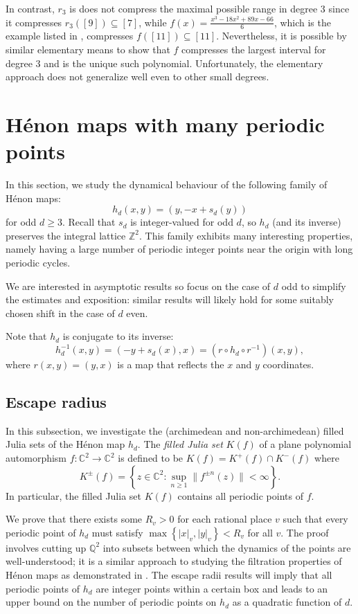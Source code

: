 \documentclass[12pt]{amsart}
\theoremstyle{definition}
\begin{document}
In contrast, $r_3$ is does not compress the maximal possible range in degree $3$ since it compresses $r_3([9])\subseteq [7]$, while $f(x) =\frac{x^3-18x^2+89x-66}{6}$, which is the example listed in \cite{doyle2022polynomialsrationalpreperiodicpoints}, compresses $f([11])\subseteq [11]$. Nevertheless, it is possible by similar elementary means to show that $f$ compresses the largest interval for degree 3 and is the unique such polynomial.  Unfortunately, the elementary approach does not generalize well even to other small degrees.




\section{Hénon maps with many periodic points} \label{section:henon}

In this section, we study the dynamical behaviour of the following family of H\'{e}non maps:
$$ h_d(x,y) = (y,-x+s_d(y)) $$
for odd $d\geq 3$. Recall that $s_d$ is integer-valued for odd $d$, so $h_d$ (and its inverse) preserves the integral lattice $\mathbb{Z}^2$. This family exhibits many interesting properties, namely having a large number of periodic integer points near the origin with long periodic cycles.  

We are interested in asymptotic results so focus on the case of $d$ odd to simplify the estimates and exposition: similar results will likely hold for some suitably chosen shift in the case of $d$ even.

Note that $h_d$ is conjugate to its inverse:
$$ h_d^{-1}(x,y) = (-y+s_d(x),x) = 
(r\circ h_d \circ r^{-1})(x,y), $$
where $r(x,y) = (y,x)$ is a map that reflects the $x$ and $y$ coordinates. 

\subsection{Escape radius}

In this subsection, we investigate the (archimedean and non-archimedean) filled Julia sets of the Hénon map $h_d$. The \emph{filled Julia set} $K(f)$ of a plane polynomial automorphism $f:\mathbb{C}^2\to \mathbb{C}^2$ is defined to be $K(f) = K^+(f) \cap K^-(f)$ where
    $$ K^{\pm}(f) = \left\{z\in \mathbb{C}^2:\sup_{n\geq 1}\|f^{\pm n}(z)\| < \infty \right\}.$$
In particular, the filled Julia set $K(f)$ contains all periodic points of $f$.

We prove that there exists some $R_v > 0$ for each rational place $v$ such that every periodic point of $h_d$ must satisfy $\max\left\{|x|_v,|y|_v\right\} < R_v$ for all $v$. The proof involves cutting up $\mathbb{Q}^2$ into subsets between which the dynamics of the points are well-understood; it is a similar approach to studying the filtration properties of Hénon maps as demonstrated in \cite{Bedford1991}. The escape radii results will imply that all periodic points of $h_d$ are integer points within a certain box and leads to an upper bound on the number of periodic points on $h_d$ as a quadratic function of $d$.
\end{document}
